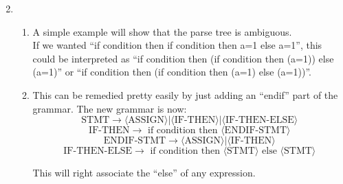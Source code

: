 
\usepackage{amsmath, verbatim, tikz, float}

\usetikzlibrary{arrows,automata}

\oddsidemargin 0in
\evensidemargin 0in
\textwidth 6.5in
\topmargin -0.5in
\textheight 9.0in
\newcommand{\norm}[1]{\left\lVert #1 \right\rVert}


\pagestyle{myheadings}

\begin{enumerate}
  \setcounter{enumi}{1} 
\item
  \begin{enumerate}
    \item 
      A simple example will show that the parse tree is ambiguous.\\
      If we wanted ``if condition then if condition then a=1 else a=1'', this could be interpreted as ``if condition then (if condition then (a=1)) else (a=1)'' or ``if condition then (if condition then (a=1) else (a=1))''.

    \item
      This can be remedied pretty easily by just adding an ``endif'' part of the grammar. The new grammar is now:
      $$\text{STMT} \longrightarrow \langle \text{ASSIGN} \rangle | \langle \text{IF-THEN} \rangle | \langle \text{IF-THEN-ELSE} \rangle$$
      $$\text{IF-THEN} \longrightarrow \text{ if condition then } \langle \text{ENDIF-STMT} \rangle$$
      $$\text{ENDIF-STMT} \longrightarrow \langle \text{ASSIGN} \rangle | \langle \text{IF-THEN} \rangle$$
      $$\text{IF-THEN-ELSE} \longrightarrow \text{ if condition then } \langle \text{STMT} \rangle \text{ else } \langle \text{STMT} \rangle$$

      This will right associate the ``else'' of any expression.
  \end{enumerate}
  
  
\end{enumerate}
